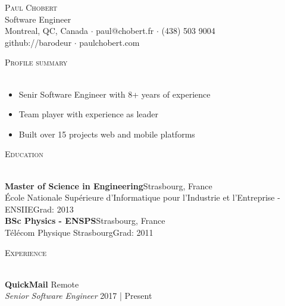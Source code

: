 \documentclass[a4paper]{article}
\newcommand{\lineunder} {
    \vspace*{-8pt} \\
    \hspace*{-18pt} \hrulefill \\
}
\newcommand{\header} [1] {
    {\hspace*{-18pt}\vspace*{6pt} \textsc{#1}}
    \vspace*{-6pt} \lineunder
}
\begin{document}
\vspace*{-40pt}

\vspace*{-10pt}
\begin{center}
    {\Huge \scshape {Paul Chobert}}\\
    Software Engineer\\
    Montreal, QC, Canada $\cdot$ paul@chobert.fr $\cdot$ (438) 503 9004\\
    github://barodeur $\cdot$ paulchobert.com\\
\end{center}

\vspace*{2mm}

\header{Profile summary}
\vspace{1mm}

\vspace{-1mm}
\begin{itemize} \itemsep 1pt
    \item Senir Software Engineer with 8+ years of experience
    \item Team player with experience as leader
    \item Built over 15 projects web and mobile platforms
\end{itemize}
\vspace{-1mm}

\vspace{2mm}

\header{Education}
\vspace{1mm}

\textbf{Master of Science in Engineering}\hfill Strasbourg, France\\
École Nationale Supérieure d'Informatique pour l'Industrie et l'Entreprise - ENSIIE\hfill Grad: 2013\\
\vspace{2mm}
\textbf{BSc Physics - ENSPS}\hfill Strasbourg, France\\
Télécom Physique Strasbourg\hfill Grad: 2011\\
\vspace{2mm}

\header{Experience}
\vspace{1mm}

\textbf{QuickMail} \hfill Remote\\
\textit{Senior Software Engineer} \hfill 2017 | Present\\
\vspace{2mm}
\end{document}
